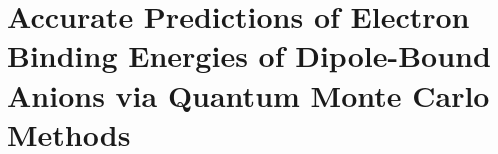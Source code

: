 \chapter{Accurate Predictions of Electron Binding Energies of Dipole-Bound Anions via Quantum Monte Carlo Methods}







